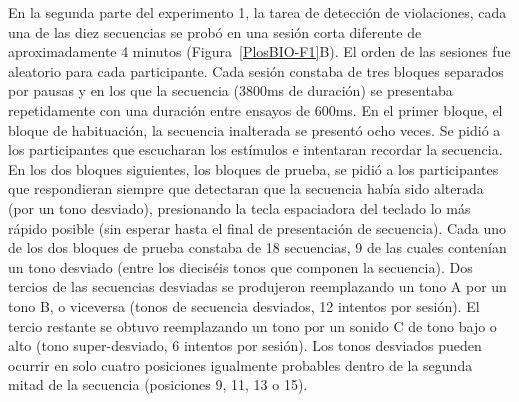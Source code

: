 En la segunda parte del experimento 1, la tarea de detección de violaciones, cada una de las diez secuencias se probó en una sesión corta diferente de aproximadamente 4 minutos (Figura~\ref{PlosBIO-F1}B). El orden de las sesiones fue aleatorio para cada participante. Cada sesión constaba de tres bloques separados por pausas y en los que la secuencia (3800ms de duración) se presentaba repetidamente con una duración entre ensayos de 600ms. En el primer bloque, el bloque de habituación, la secuencia inalterada se presentó ocho veces. Se pidió a los participantes que escucharan los estímulos e intentaran recordar la secuencia. En los dos bloques siguientes, los bloques de prueba, se pidió a los participantes que respondieran siempre que detectaran que la secuencia había sido alterada (por un tono desviado), presionando la tecla espaciadora del teclado lo más rápido posible (sin esperar hasta el final de presentación de secuencia). Cada uno de los dos bloques de prueba constaba de 18 secuencias, 9 de las cuales contenían un tono desviado (entre los dieciséis tonos que componen la secuencia). Dos tercios de las secuencias desviadas se produjeron reemplazando un tono A por un tono B, o viceversa (tonos de secuencia desviados, 12 intentos por sesión). El tercio restante se obtuvo reemplazando un tono por un sonido C de tono bajo o alto (tono super-desviado, 6 intentos por sesión). Los tonos desviados pueden ocurrir en solo cuatro posiciones igualmente probables dentro de la segunda mitad de la secuencia (posiciones 9, 11, 13 o 15).


